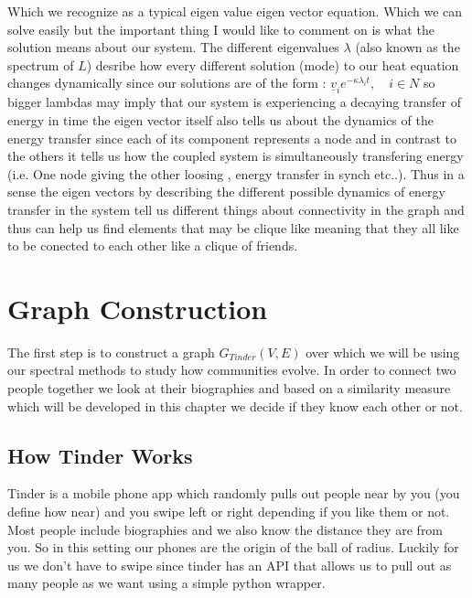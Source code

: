 \documentclass[10pt,twocolumn]{article}
\begin{document}
Which we recognize as a typical eigen value eigen vector equation. Which we can solve easily but the important thing I would like to comment on is what the solution means about our system. The different eigenvalues $\lambda$ (also known as the spectrum of $L$) desribe how every different solution (mode) to our heat equation changes dynamically since our solutions are of the form :  $\underline{v}_{i}e^{-\kappa\lambda_{i} t}, \quad i \in N$ so bigger lambdas may imply that our system is experiencing a decaying transfer of energy in time the eigen vector itself also tells us about the dynamics of the energy transfer since each of its component represents a node and in contrast to the others it tells us how the coupled system is simultaneously transfering energy (i.e. One node giving the other loosing , energy transfer in synch etc..). Thus in a sense the eigen vectors by describing the different possible dynamics of energy transfer in the system tell us different things about connectivity in the graph and thus can  help us find elements that may be clique like meaning that they all like to be conected to each other like a clique of friends.

\section{Graph Construction}
The first step is to construct a graph $G_{Tinder}(V,E)$ over which we will be using our spectral methods to study how communities evolve. In order to connect two people together we look at their biographies and based on a similarity measure which will be developed in this chapter we decide if they know each other or not. 
\subsection{How Tinder Works}
Tinder is a mobile phone app which randomly pulls out people near by you (you define how near) and you swipe left or right depending if you like them or not. Most people include biographies and we also know the distance they are from you. So in this setting our phones are the origin of the ball of radius. Luckily for us we don't have to swipe since tinder has an API that allows us to  pull out as many people as we want using a simple python wrapper.
\end{document}
